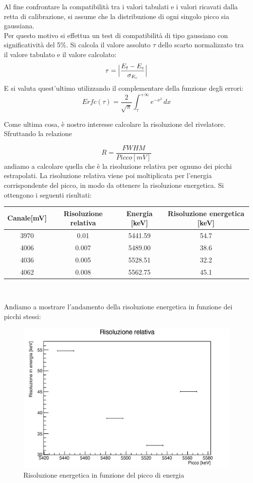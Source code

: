\documentclass[a4paper,10pt]{article}
\begin{document}
\noindent Al fine confrontare la compatibilit\`a tra i valori tabulati e i valori ricavati dalla retta di calibrazione, si assume che la distribuzione di ogni singolo picco sia gaussiana.\\
Per questo motivo si effettua un test di compatibilit\`a di tipo gaussiano con significativit\`a del 5\%.
Si calcola il valore assoluto $\tau$ dello scarto normalizzato tra il valore tabulato e il valore calcolato:
$$
    \tau = \abs\Big{\frac{E_t - E_c}{\sigma_{E_c}}}
$$
E si valuta quest'ultimo utilizzando il complementare della funzione degli errori:
$$
    Erfc(\tau) = \frac{2}{\sqrt{\pi}}\int_{\tau}^{+\infty} e^{-x^2}\, dx
$$

\noindent Come ultima cosa, \`e nostro interesse calcolare la risoluzione del rivelatore. Sfruttando la relazione

$$
    R=\frac{FWHM}{Picco[mV]}
$$
andiamo a calcolare quella che \`e la risoluzione relativa per ognuno dei picchi estrapolati. La risoluzione relativa viene poi moltiplicata per l'energia corrispondente del picco, in modo da ottenere la risoluzione energetica. Si ottengono i seguenti risultati:

\begin{center}
    \begin{tabular}{cccc}
        \toprule
        Canale[mV] & Risoluzione relativa & Energia [keV] & Risoluzione energetica [keV] \\
        \midrule
        3970 & 0.01 & 5441.59 & 54.7\\
        4006 & 0.007 & 5489.00 & 38.6\\
        4036 & 0.005 & 5528.51 & 32.2\\
        4062 & 0.008 & 5562.75 & 45.1\\
        \bottomrule
    \end{tabular}\\
\end{center}

\noindent Andiamo a mostrare l$'$andamento della risoluzione energetica in funzione dei picchi stessi:

\begin{figure}[H]
    \centering
    \includegraphics[scale=0.4]{risoluzione.png}
    \caption{Risoluzione energetica in funzione del picco di energia}
\end{figure}
\end{document}

